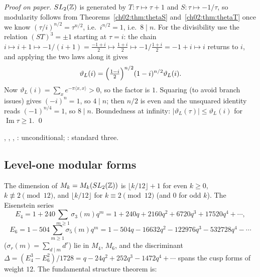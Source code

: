 \emph{Proof on paper.}  $SL_2({\mathbb{Z}})$ is generated by $T:\tau\mapsto\tau+1$ and $S:\tau\mapsto-1/\tau$,
so modularity follows from Theorems~\ref{ch02:thm:thetaS} and~\ref{ch02:thm:thetaT} once we know
$(\tau/i)^{n/2}=\tau^{n/2}$, i.e.\ $i^{n/2}=1$, i.e.\ $8\mid n$.  For the divisibility use the
relation $(ST)^3=\pm1$ starting at $\tau=i$: the chain $i\mapsto i+1\mapsto-1/(i+1)=\tfrac{-1+i}2
\mapsto\tfrac{1+i}2\mapsto-1/\tfrac{1+i}2=-1+i\mapsto i$ returns to $i$, and applying the two
laws along it gives
\begin{equation*}
\vartheta_L(i)=\Bigl(\tfrac{1-i}2\Bigr)^{n/2}(1-i)^{n/2}\vartheta_L(i).
\end{equation*}
Now $\vartheta_L(i)=\sum_xe^{-\pi\langle x,x\rangle}>0$, so the factor is $1$.  Squaring (to avoid
branch issues) gives $(-i)^n=1$, so $4\mid n$; then $n/2$ is even and the unsquared identity reads
$(-1)^{n/4}=1$, so $8\mid n$.  Boundedness at infinity: $|\vartheta_L(\tau)|\le\vartheta_L(i)$ for
$\operatorname{Im}\tau\ge1$. \qed

\begin{status}
, ,
, : unconditional;
: standard three.
\end{status}

\subsection{Level-one modular forms}

The dimension of $M_k=M_k(SL_2({\mathbb{Z}}))$ is $\lfloor k/12\rfloor+1$ for even $k\ge0$,
$k\not\equiv2\pmod{12}$, and $\lfloor k/12\rfloor$ for $k\equiv2\pmod{12}$ (and $0$ for odd $k$).
The Eisenstein series
\begin{equation*}
E_4=1+240\sum_{m\ge1}\sigma_3(m)q^m=1+240q+2160q^2+6720q^3+17520q^4+\cdots,
\end{equation*}
\begin{equation*}
E_6=1-504\sum_{m\ge1}\sigma_5(m)q^m=1-504q-16632q^2-122976q^3-532728q^4-\cdots
\end{equation*}
($\sigma_r(m)=\sum_{d\mid m}d^r$) lie in $M_4$, $M_6$, and the discriminant
$\Delta=(E_4^3-E_6^2)/1728=q-24q^2+252q^3-1472q^4+\cdots$ spans the cusp forms of weight $12$.  The
fundamental structure theorem is:

